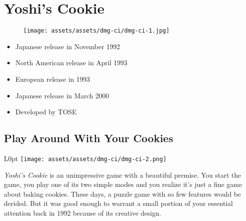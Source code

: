 \documentclass{book}
\begin{document}
\begingroup \chapter*{Yoshi’s Cookie} \endgroup
\begin{figure}[H]
\vskip 4pt
\centering
\texttt{[image: assets/assets/dmg-ci/dmg-ci-1.jpg]}\end{figure}
\begin{itemize} [nosep]




\item Japanese release in November 1992







\item North American release in April 1993







\item European release in 1993







\item Japanese release in March 2000












\item Developed by TOSE

\end{itemize}\noindent

\newpage\FloatBarrier\needspace{10mm}\section*{Play Around With Your Cookies}\nopagebreak[4]
\begin{wrapfigure}{L}{0pt} \texttt{[image: assets/assets/dmg-ci/dmg-ci-2.png]}\end{wrapfigure}
\emph{Yoshi’s Cookie} is an unimpressive game with a beautiful premise. You start the game, you play one of its two simple modes and you realize it’s just a fine game about baking cookies. These days, a puzzle game with so few features would be derided. But it was good enough to warrant a small portion of your essential attention back in 1992 because of its creative design.
\end{document}
